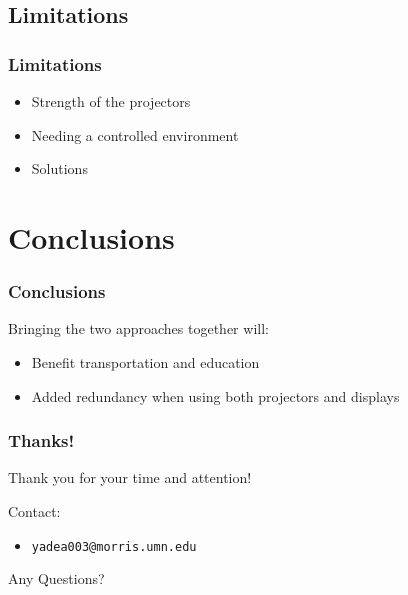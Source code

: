 \documentclass{beamer}
\newcommand{\linespace}{\vskip 0.25cm}
\begin{document}
\subsection{Limitations}
\begin{frame}	
\frametitle{Limitations}
	\begin{itemize}
		\item Strength of the projectors 
		\item Needing a controlled environment 
		\item Solutions
	\end{itemize}
\end{frame}

\section[Conclusions]{Conclusions}
\begin{frame}
\frametitle{Conclusions}
	Bringing the two approaches together will:
	\begin{itemize}
		\item Benefit transportation and education
		\item Added redundancy when using both projectors and displays
	\end{itemize}
\end{frame}

\begin{frame}
	\frametitle{Thanks!}
	
	Thank you for your time and attention!
		
	\linespace
	\linespace
	
	Contact:  
	\begin{itemize}
		\item \texttt{yadea003@morris.umn.edu}
	\end{itemize}
	
	\linespace
	\linespace
	
	\begin{center}
	{\huge Any Questions?}
	\end{center}
\end{frame}
\end{document}

